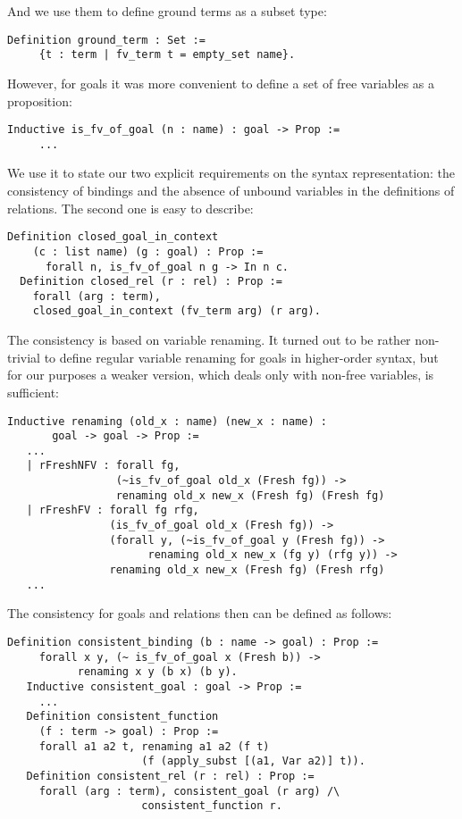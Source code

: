 And we use them to define ground terms as a subset type:

\begin{lstlisting}[language=Coq]
   Definition ground_term : Set :=
     {t : term | fv_term t = empty_set name}.
\end{lstlisting}

However, for goals it was more convenient to define a set of free variables as a proposition:

\begin{lstlisting}[language=Coq]
   Inductive is_fv_of_goal (n : name) : goal -> Prop :=
     ...
\end{lstlisting}

We use it to state our two explicit requirements on the syntax representation: the consistency of bindings and the absence of unbound variables in the definitions of relations. The second one is easy to describe:

\begin{lstlisting}[language=Coq] 
  Definition closed_goal_in_context 
    (c : list name) (g : goal) : Prop :=
      forall n, is_fv_of_goal n g -> In n c.
  Definition closed_rel (r : rel) : Prop :=
    forall (arg : term),
    closed_goal_in_context (fv_term arg) (r arg).
\end{lstlisting}

The consistency is based on variable renaming. It turned out to be rather non-trivial to define regular variable renaming for goals in higher-order syntax, but for our purposes
a weaker version, which deals only with non-free variables, is sufficient:

\begin{lstlisting}[language=Coq]
   Inductive renaming (old_x : name) (new_x : name) :
       goal -> goal -> Prop :=
   ...
   | rFreshNFV : forall fg,
                 (~is_fv_of_goal old_x (Fresh fg)) ->
                 renaming old_x new_x (Fresh fg) (Fresh fg)
   | rFreshFV : forall fg rfg,
                (is_fv_of_goal old_x (Fresh fg)) ->
                (forall y, (~is_fv_of_goal y (Fresh fg)) ->
                      renaming old_x new_x (fg y) (rfg y)) ->
                renaming old_x new_x (Fresh fg) (Fresh rfg)
   ...
\end{lstlisting}

The consistency for goals and relations then can be defined as follows:

\begin{lstlisting}[language=Coq]
   Definition consistent_binding (b : name -> goal) : Prop :=
     forall x y, (~ is_fv_of_goal x (Fresh b)) ->
           renaming x y (b x) (b y).
   Inductive consistent_goal : goal -> Prop :=
     ...
   Definition consistent_function
     (f : term -> goal) : Prop :=
     forall a1 a2 t, renaming a1 a2 (f t)
                     (f (apply_subst [(a1, Var a2)] t)).
   Definition consistent_rel (r : rel) : Prop :=
     forall (arg : term), consistent_goal (r arg) /\
                     consistent_function r.
\end{lstlisting}

